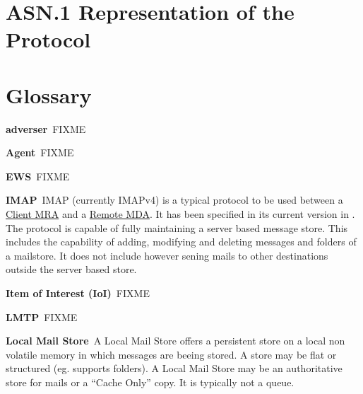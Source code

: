 \documentclass[10pt,a4paper,appendixprefix,pdfusetitle,twocolumn,draft]{scrbook}
\newenvironment{entry}{\par\leavevmode\hangpara{1.5mm}{1}\ignorespaces}{\RaggedRight\par}
\newcommand*{\mainentry}[2]{{\bfseries{#1\label{def:#1}}}~#2\par}
\newcommand*{\defref}[1]{\hyperref[def:#1]{#1}}
\begin{document}
\chapter{ASN.1 Representation of the Protocol\label{app:asnone}}
 
\twocolumn


\chapter{Glossary}

\begin{entry}
  \mainentry{adverser}{FIXME}
\end{entry}

\begin{entry}
  \mainentry{Agent}{FIXME}
\end{entry}

\begin{entry}
  \mainentry{EWS}{FIXME}
\end{entry}

\begin{entry}
  \mainentry{IMAP}{IMAP (currently IMAPv4) is a typical protocol to be used between a \defref{Client MRA} and a \defref{Remote MDA}. It has been specified in its current version in \cite{RFC3501}. The protocol is capable of fully maintaining a server based message store. This includes the capability of adding, modifying and deleting messages and folders of a mailstore. It does not include however sening mails to other destinations outside the server based store.}
\end{entry}

\begin{entry}
	\mainentry{Item of Interest (IoI)}{FIXME}
\end{entry}

\begin{entry}
  \mainentry{LMTP}{FIXME}
\end{entry}

\begin{entry}
  \mainentry{Local Mail Store}{A Local Mail Store offers a persistent store on a local non volatile memory in which messages are beeing stored. A store may be flat or structured (eg. supports folders). A Local Mail Store may be an authoritative store for mails or a ``Cache Only'' copy. It is typically not a queue.}
\end{entry}
\end{document}
